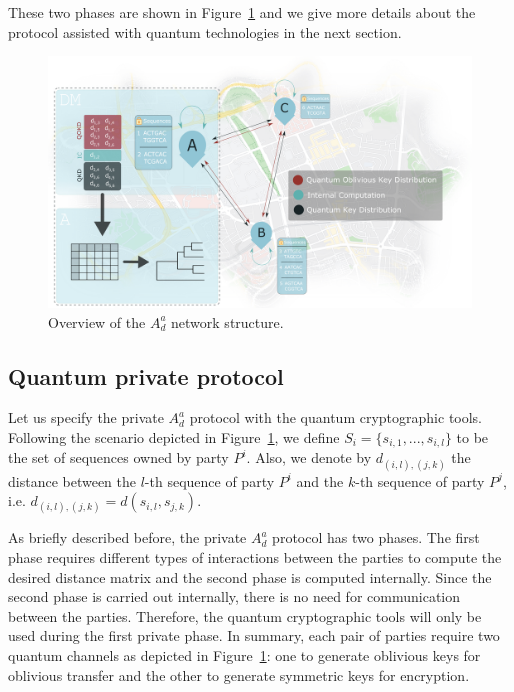 These two phases are shown in Figure~\ref{fig:network} and we give more details about the protocol assisted with quantum technologies in the next section. 

\begin{figure}[t]
    \centering
    \includegraphics[scale=0.75]{Chapter_PrivatePhylogeneticTrees/PPT.png}
    \caption{Overview of the $A^a_d$ network structure.}
    \label{fig:network}
\end{figure}

\subsection{Quantum private protocol}\label{privProtocol}

Let us specify the private $A_d^a$ protocol with the quantum cryptographic tools. Following the scenario depicted in Figure~\ref{fig:network}, we define $S_i = \{s_{i,1}, ..., s_{i,l}\}$ to be the set of sequences owned by party $P^i$. Also, we denote by $d_{(i,l), (j, k)}$ the distance between the $l$-th sequence of party $P^i$ and the $k$-th sequence of party $P^j$, i.e. $d_{(i,l), (j, k)} = d(s_{i,l}, s_{j,k})$.

As briefly described before, the private $A_d^a$ protocol has two phases. The first phase requires different types of interactions between the parties to compute the desired distance matrix and the second phase is computed internally. Since the second phase is carried out internally, there is no need for communication between the parties. Therefore, the quantum cryptographic tools will only be used during the first private phase. In summary, each pair of parties require two quantum channels as depicted in Figure~\ref{fig:network}: one to generate oblivious keys for oblivious transfer and the other to generate symmetric keys for encryption.

